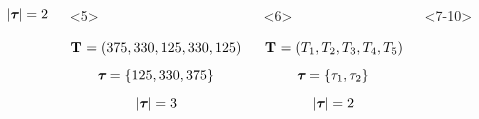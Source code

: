 \begin{frame}
\begin{columns}[c]
\begin{onlyenv}
\begin{displaybox}[4.5cm]
                \[
                    \lvert \boldsymbol{\tau_{}} \rvert = 2
                \]\vspace{0mm}
            \end{displaybox}
            \end{onlyenv}
            \begin{onlyenv}<5>
            \begin{displaybox}[4.5cm]
                {\small
                \[
                    \mathbf{T_{}} = (375,330,125,330,125)
                \]\vspace{0mm}
                }
                \[
                    \boldsymbol{\tau_{}} = \{125,330,375\}
                \]\vspace{0mm}
                \[
                    \lvert \boldsymbol{\tau_{}} \rvert = 3
                \]\vspace{0mm}
            \end{displaybox}
            \end{onlyenv}
            \begin{onlyenv}<6>
            \begin{displaybox}[4.5cm]
                {\small
                \[
                    \mathbf{T_{}} = (T_{1},T_{2},T_{3},T_{4},T_{5})
                \]\vspace{0mm}
                }
                \[
                    \boldsymbol{\tau_{}} = \{\tau_{1},\tau_{2}\}
                \]\vspace{0mm}
                \[
                    \lvert \boldsymbol{\tau_{}} \rvert = 2
                \]\vspace{0mm}
            \end{displaybox}
            \end{onlyenv}
            \begin{onlyenv}<7-10>
            \begin{displaybox}[4.5cm]

\end{displaybox}
\end{onlyenv}
\end{columns}
\end{frame}
